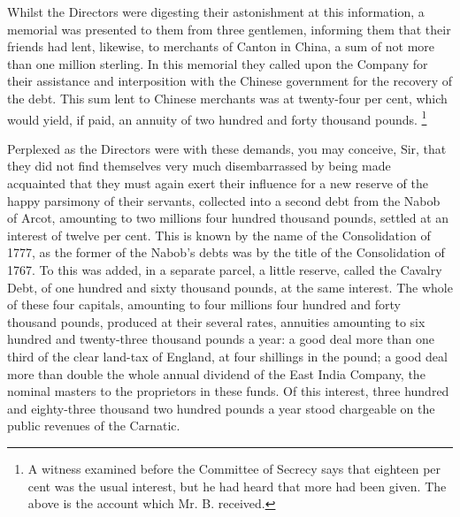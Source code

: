 Whilst the Directors were digesting their astonishment at this information, a memorial was presented to them from three gentlemen, informing them that their friends had lent, likewise, to merchants of Canton in China, a sum of not more than one million sterling. In this memorial they called upon the Company for their assistance and interposition with the Chinese government for the recovery of the debt. This sum lent to Chinese merchants was at twenty-four per cent, which would yield, if paid, an annuity of two hundred and forty thousand pounds.
\footnote{ A witness examined before the Committee of Secrecy says that eighteen per cent was the usual interest, but he had heard that more had been given. The above is the account which Mr. B. received.}


Perplexed as the Directors were with these demands, you may conceive, Sir, that they did not find themselves very much disembarrassed by being made acquainted that they must again exert their influence for a new reserve of the happy parsimony of their servants, collected into a second debt from the Nabob of Arcot, amounting to two millions four hundred thousand pounds, settled at an interest of twelve per cent. This is known by the name of the Consolidation of 1777, as the former of the Nabob's debts was by the title of the Consolidation of 1767. To this was added, in a separate parcel, a little reserve, called the Cavalry Debt, of one hundred and sixty thousand pounds, at the same interest. The whole of these four capitals, amounting to four millions four hundred and forty thousand pounds, produced at their several rates, annuities amounting to six hundred and twenty-three thousand pounds a year: a good deal more than one third of the clear land-tax of England, at four shillings in the pound; a good deal more than double the whole annual dividend of the East India Company, the nominal masters to the proprietors in these funds. Of this interest, three hundred and eighty-three thousand two hundred pounds a year stood chargeable on the public revenues of the Carnatic.

